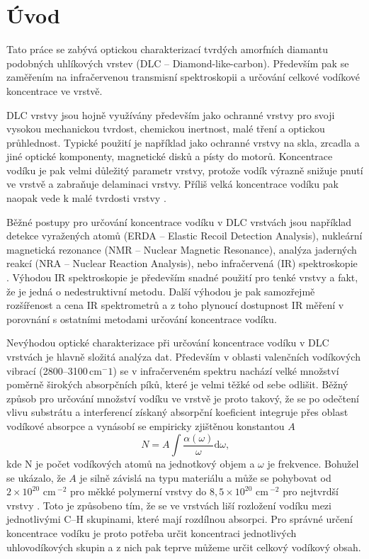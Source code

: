 \chapter*{Úvod}
\setcounter{page}{1}

Tato práce se zabývá optickou charakterizací tvrdých amorfních diamantu podobných uhlíkových vrstev (DLC -- Diamond-like-carbon). Především pak se zaměřením na infračervenou transmisní spektroskopii a určování celkové vodíkové koncentrace ve vrstvě.

DLC vrstvy jsou hojně využívány především jako ochranné vrstvy pro svoji vysokou mechanickou tvrdost, chemickou inertnost, malé tření a optickou průhlednost. Typické použití je například jako ochranné vrstvy na skla, zrcadla a jiné optické komponenty, magnetické disků a písty do motorů. Koncentrace vodíku je pak velmi důležitý parametr vrstvy, protože vodík výrazně snižuje pnutí ve vrstvě a zabraňuje delaminaci vrstvy. Příliš velká koncentrace vodíku pak naopak vede k malé tvrdosti vrstvy \cite{Robertson2002}. 

Běžné postupy pro určování koncentrace vodíku v DLC vrstvách jsou například detekce vyražených atomů  (ERDA -- Elastic Recoil Detection Analysis), nukleární magnetická rezonance (NMR -- Nuclear Magnetic Resonance), analýza jaderných reakcí (NRA -- Nuclear Reaction Analysis), nebo infračervená (IR) spektroskopie \cite{Robertson2002}. Výhodou IR spektroskopie je především snadné použití pro tenké vrstvy a fakt, že je jedná o nedestruktivní metodu. Další výhodou je pak samozřejmě rozšířenost a cena IR spektrometrů a z toho plynoucí dostupnost IR měření v porovnání s ostatními metodami určování koncentrace vodíku.

Nevýhodou optické charakterizace při určování koncentrace vodíku v DLC vrstvách je hlavně složitá analýza dat. Především v oblasti valenčních vodíkových vibrací (2800--3100\,cm$^-1$) se v infračerveném spektru nachází velké množství poměrně širokých absorpčních píků, které je velmi těžké od sebe odlišit. Běžný způsob pro určování množství vodíku ve vrstvě je proto takový, že se po odečtení vlivu substrátu a interferencí získaný absorpční koeficient integruje přes oblast vodíkové absorpce a vynásobí se empiricky zjištěnou konstantou $A$
\begin{equation}
N = A \int \frac{\alpha(\omega)}{\omega} \mathrm{d}\omega \text{,}
\end{equation}
kde N je počet vodíkových atomů na jednotkový objem a $\omega$ je frekvence. Bohužel se ukázalo, že $A$ je silně závislá na typu materiálu a může se pohybovat od $2 \times 10^{20}$ cm\,$^{-2}$ pro měkké polymerní vrstvy do $8,5 \times 10^{20}$ cm\,$^{-2}$ pro nejtvrdší vrstvy \cite{jacob1996}. Toto je způsobeno tím, že se ve vrstvách liší rozložení vodíku mezi jednotlivými C--H skupinami, které mají rozdílnou absorpci. Pro správné určení koncentrace vodíku je proto potřeba určit koncentraci jednotlivých uhlovodíkových skupin a z nich pak teprve můžeme určit celkový vodíkový obsah. 

